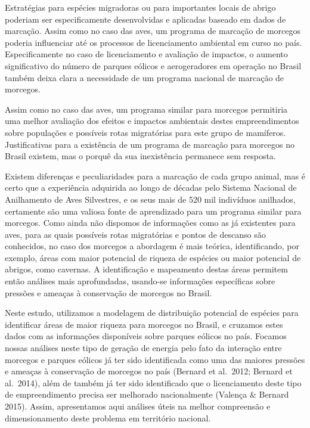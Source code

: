 \documentclass[
  oneside]{scrbook}
\begin{document}
Estratégias para espécies migradoras ou para importantes locais de abrigo poderiam ser especificamente desenvolvidas e aplicadas baseado em dados de marcação. Assim como no caso das aves, um programa de marcação de morcegos poderia influenciar até os processos de licenciamento ambiental em curso no país. Especificamente no caso de licenciamento e avaliação de impactos, o aumento significativo do número de parques eólicos e aerogeradores em operação no Brasil também deixa clara a necessidade de um programa nacional de marcação de morcegos.

Assim como no caso das aves, um programa similar para morcegos permitiria uma melhor avaliação dos efeitos e impactos ambientais destes empreendimentos sobre populações e possíveis rotas migratórias para este grupo de mamíferos. Justificativas para a existência de um programa de marcação para morcegos no Brasil existem, mas o porquê da sua inexistência permanece sem resposta.

Existem diferenças e peculiaridades para a marcação de cada grupo animal, mas é certo que a experiência adquirida ao longo de décadas pelo Sistema Nacional de Anilhamento de Aves Silvestres, e os seus mais de 520 mil indivíduos anilhados, certamente são uma valiosa fonte de aprendizado para um programa similar para morcegos. Como ainda não dispomos de informações como as já existentes para aves, para as quais possíveis rotas migratórias e pontos de descanso são conhecidos, no caso dos morcegos a abordagem é mais teórica, identificando, por exemplo, áreas com maior potencial de riqueza de espécies ou maior potencial de abrigos, como cavernas. A identificação e mapeamento destas áreas permitem então análises mais aprofundadas, usando-se informações específicas sobre pressões e ameaças à conservação de morcegos no Brasil.

Neste estudo, utilizamos a modelagem de distribuição potencial de espécies para identificar áreas de maior riqueza para morcegos no Brasil, e cruzamos estes dados com as informações disponíveis sobre parques eólicos no país. Focamos nossas análises neste tipo de geração de energia pelo fato da interação entre morcegos e parques eólicos já ter sido identificada como uma das maiores pressões e ameaças à conservação de morcegos no país (Bernard et al.~2012; Bernard et al.~2014), além de também já ter sido identificado que o licenciamento deste tipo de empreendimento precisa ser melhorado nacionalmente (Valença \& Bernard 2015). Assim, apresentamos aqui análises úteis na melhor compreensão e dimensionamento deste problema em território nacional.
\end{document}

